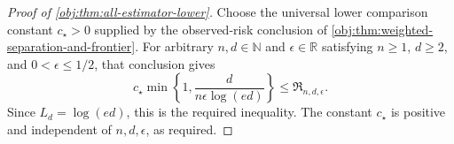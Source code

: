 \begin{proof}[Proof of \cref{obj:thm:all-estimator-lower}]
Choose the universal lower comparison constant \(c_\star>0\) supplied by the observed-risk conclusion of \cref{obj:thm:weighted-separation-and-frontier}. For arbitrary \(n,d\in\mathbb N\) and \(\epsilon\in\mathbb R\) satisfying \(n\ge1\), \(d\ge2\), and \(0<\epsilon\le1/2\), that conclusion gives
\[
c_\star\min\left\{1,\frac{d}{n\epsilon\log(ed)}\right\}
\le \mathfrak R_{n,d,\epsilon}.
\]
Since \(L_d=\log(ed)\), this is the required inequality. The constant \(c_\star\) is positive and independent of \(n,d,\epsilon\), as required.
\end{proof}
